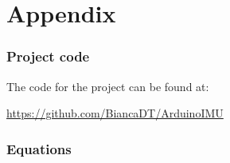 \chapter{Appendix}

\subsection{Project code}

The code for the project can be found at:

\url{https://github.com/BiancaDT/ArduinoIMU} 


\subsection{Equations}


